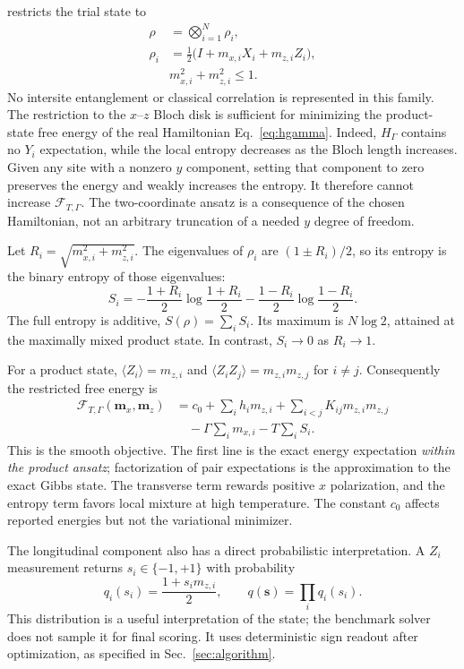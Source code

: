 \QeFEM{} restricts the trial state to
\begin{equation}
 \begin{aligned}
 \rho&=\bigotimes_{i=1}^{N}\rho_i,\\
 \rho_i&=\tfrac12\bigl(I+m_{x,i}X_i+m_{z,i}Z_i\bigr),\\
 &m_{x,i}^2+m_{z,i}^2\leq1.
 \end{aligned}
 \label{eq:ansatz}
\end{equation}
No intersite entanglement or classical correlation is represented in this
family. The restriction to the $x$--$z$ Bloch disk is sufficient for
minimizing the product-state free energy of the real Hamiltonian
Eq.~\eqref{eq:hgamma}. Indeed, $H_\Gamma$ contains no $Y_i$ expectation,
while the local entropy decreases as the Bloch length increases. Given any
site with a nonzero $y$ component, setting that component to zero preserves
the energy and weakly increases the entropy. It therefore cannot increase
$\mathcal F_{T,\Gamma}$. The two-coordinate ansatz is a consequence of the
chosen Hamiltonian, not an arbitrary truncation of a needed $y$ degree of
freedom.

Let $R_i=\sqrt{m_{x,i}^2+m_{z,i}^2}$. The eigenvalues of $\rho_i$ are
$(1\pm R_i)/2$, so its entropy is the binary entropy of those eigenvalues:
\begin{equation}
 S_i= -\frac{1+R_i}{2}\log\frac{1+R_i}{2}
      -\frac{1-R_i}{2}\log\frac{1-R_i}{2}.
 \label{eq:entropy}
\end{equation}
The full entropy is additive, $S(\rho)=\sum_iS_i$. Its maximum is
$N\log2$, attained at the maximally mixed product state. In contrast,
$S_i\to0$ as $R_i\to1$.

For a product state,
$\langle Z_i\rangle=m_{z,i}$ and
$\langle Z_iZ_j\rangle=m_{z,i}m_{z,j}$ for $i\ne j$.
Consequently the restricted free energy is
\begin{equation}
 \boxed{\begin{aligned}
 \mathcal F_{T,\Gamma}(\bm m_x,\bm m_z)
 &=c_0+\sum_i h_i m_{z,i}
   +\sum_{i<j}K_{ij}m_{z,i}m_{z,j}\\
 &\quad-\Gamma\sum_i m_{x,i}-T\sum_iS_i.
 \end{aligned}}
 \label{eq:qefemF}
\end{equation}
This is the smooth \QeFEM{} objective. The first line is the exact energy
expectation \emph{within the product ansatz}; factorization of pair
expectations is the approximation to the exact Gibbs state. The transverse
term rewards positive $x$ polarization, and the entropy term favors local
mixture at high temperature. The constant $c_0$ affects reported energies
but not the variational minimizer.

The longitudinal component also has a direct probabilistic interpretation.
A $Z_i$ measurement returns $s_i\in\{-1,+1\}$ with probability
\begin{equation}
 q_i(s_i)=\frac{1+s_i m_{z,i}}{2},\qquad
 q(\bm s)=\prod_iq_i(s_i).
 \label{eq:measure}
\end{equation}
This distribution is a useful interpretation of the state; the benchmark
solver does not sample it for final scoring. It uses deterministic sign
readout after optimization, as specified in Sec.~\ref{sec:algorithm}.

